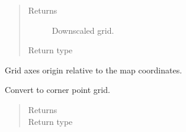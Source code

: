 \documentclass[letterpaper,10pt,english]{sphinxmanual}
\begin{document}
\begin{fulllineitems}
\begin{fulllineitems}
\begin{quote}
\begin{description}
\item[{Returns}] \leavevmode
{} \textendash{} Downscaled grid.

\item[{Return type}] \leavevmode
{\hyperref[\detokenize{api/grids:geology.src.OrthogonalUniformGrid}]{}}

\end{description}\end{quote}

\end{fulllineitems}


\begin{fulllineitems}
\label{\detokenize{api/grids:geology.src.OrthogonalUniformGrid.origin}}
Grid axes origin relative to the map coordinates.

\end{fulllineitems}


\begin{fulllineitems}
\label{\detokenize{api/grids:geology.src.OrthogonalUniformGrid.to_corner_point}}
Convert to corner point grid.
\begin{quote}\begin{description}
\item[{Returns}] \leavevmode
{}

\item[{Return type}] \leavevmode
{\hyperref[\detokenize{api/grids:geology.src.CornerPointGrid}]{}}

\end{description}\end{quote}

\end{fulllineitems}



\end{fulllineitems}
\end{document}
